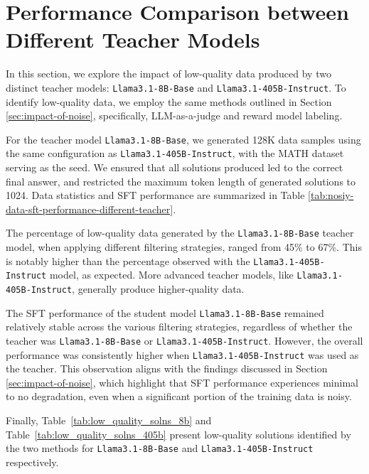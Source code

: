 




\section{Performance Comparison between Different Teacher Models}


\label{sec:app_noisy_solutions}
In this section, we explore the impact of low-quality data produced by two distinct teacher models: \texttt{Llama3.1-8B-Base} and \texttt{Llama3.1-405B-Instruct}. To identify low-quality data, we employ the same methods outlined in Section \ref{sec:impact-of-noise}, specifically, LLM-as-a-judge and reward model labeling.






For the teacher model \texttt{Llama3.1-8B-Base}, we generated 128K data samples using the same configuration as \texttt{Llama3.1-405B-Instruct}, with the MATH dataset serving as the seed. We ensured that all solutions produced led to the correct final answer, and restricted the maximum token length of generated solutions to 1024. Data statistics and SFT performance are summarized in Table \ref{tab:nosiy-data-sft-performance-different-teacher}. 

The percentage of low-quality data generated by the \texttt{Llama3.1-8B-Base} teacher model, when applying different filtering strategies, ranged from 45\% to 67\%. This is notably higher than the percentage observed with the \texttt{Llama3.1-405B-Instruct} model, as expected. More advanced teacher models, like \texttt{Llama3.1-405B-Instruct}, generally produce higher-quality data.

The SFT performance of the student model \texttt{Llama3.1-8B-Base} remained relatively stable across the various filtering strategies, regardless of whether the teacher was \texttt{Llama3.1-8B-Base} or \texttt{Llama3.1-405B-Instruct}. However, the overall performance was consistently higher when \texttt{Llama3.1-405B-Instruct} was used as the teacher. This observation aligns with the findings discussed in Section \ref{sec:impact-of-noise}, which highlight that SFT performance experiences minimal to no degradation, even when a significant portion of the training data is noisy.

Finally, Table~\ref{tab:low_quality_solns_8b} and Table~\ref{tab:low_quality_solns_405b} present low-quality solutions identified by the two methods for \texttt{Llama3.1-8B-Base} and \texttt{Llama3.1-405B-Instruct} respectively. 















